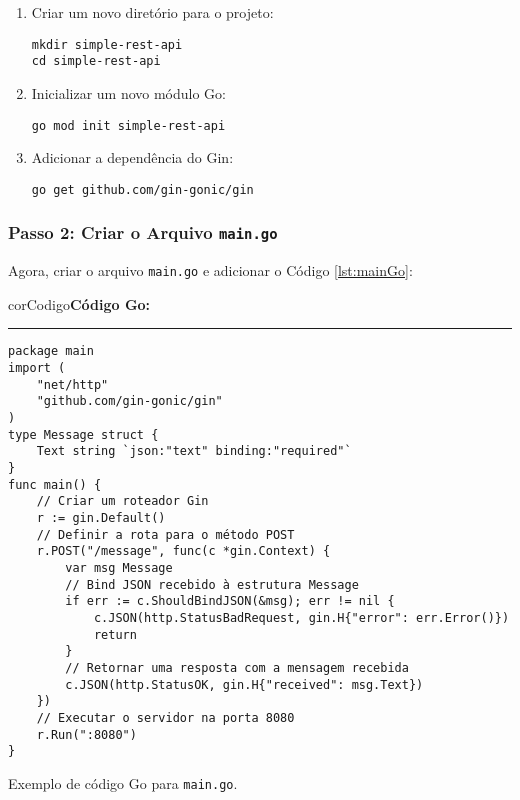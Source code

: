 \begin{enumerate}
    \item Criar um novo diretório para o projeto:
    \begin{verbatim}
mkdir simple-rest-api
cd simple-rest-api
    \end{verbatim}

    \item Inicializar um novo módulo Go:
    \begin{verbatim}
go mod init simple-rest-api
    \end{verbatim}

    \item Adicionar a dependência do Gin:
    \begin{verbatim}
go get github.com/gin-gonic/gin
    \end{verbatim}
\end{enumerate}

\subsubsection{Passo 2: Criar o Arquivo \texttt{main.go}}

Agora, criar o arquivo \texttt{main.go} e adicionar o Código \ref{lst:mainGo}:

\begin{listing}[!ht]
    \begin{myboxCode}{corCodigo}{\textbf{Código Go: }}\vspace{3mm}
    \hrule
    \begin{verbatim}
package main
import (
    "net/http"
    "github.com/gin-gonic/gin"
)
type Message struct {
    Text string `json:"text" binding:"required"`
}
func main() {
    // Criar um roteador Gin
    r := gin.Default()
    // Definir a rota para o método POST
    r.POST("/message", func(c *gin.Context) {
        var msg Message
        // Bind JSON recebido à estrutura Message
        if err := c.ShouldBindJSON(&msg); err != nil {
            c.JSON(http.StatusBadRequest, gin.H{"error": err.Error()})
            return
        }
        // Retornar uma resposta com a mensagem recebida
        c.JSON(http.StatusOK, gin.H{"received": msg.Text})
    })
    // Executar o servidor na porta 8080
    r.Run(":8080")
}
\end{verbatim}
\end{myboxCode}
\caption{Exemplo de código Go para \texttt{main.go}.}
\label{lst:mainGo}
\end{listing}

